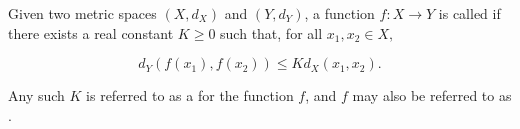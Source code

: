 \documentclass{article}
\begin{document}
\begin{definition}
	Given two \@{metric spaces} $(X, d_X)$ and $(Y, d_Y)$, a \@{function} $f: X \to Y$ is called  if there exists a \@{real} constant $K \geq 0$ such that, for all $x_1, x_2 \in X,$

	\[ d_Y(f(x_1),f(x_2)) \leq Kd_X(x_1, x_2). \]

	Any such $K$ is referred to as a  for the function $f$, and $f$ may also be referred to as . 
\end{definition}
\end{document}
